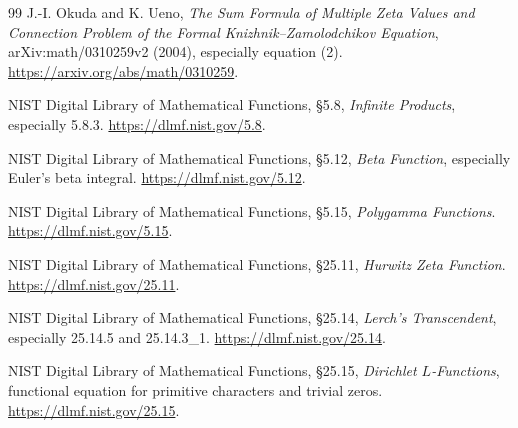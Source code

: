 \begin{thebibliography}{99}
J.-I. Okuda and K. Ueno,
\emph{The Sum Formula of Multiple Zeta Values and Connection Problem
of the Formal Knizhnik--Zamolodchikov Equation},
arXiv:math/0310259v2 (2004), especially equation (2).
\url{https://arxiv.org/abs/math/0310259}.

NIST Digital Library of Mathematical Functions,
\S5.8, \emph{Infinite Products}, especially 5.8.3.
\url{https://dlmf.nist.gov/5.8}.

NIST Digital Library of Mathematical Functions,
\S5.12, \emph{Beta Function}, especially Euler's beta integral.
\url{https://dlmf.nist.gov/5.12}.

NIST Digital Library of Mathematical Functions,
\S5.15, \emph{Polygamma Functions}.
\url{https://dlmf.nist.gov/5.15}.

NIST Digital Library of Mathematical Functions,
\S25.11, \emph{Hurwitz Zeta Function}.
\url{https://dlmf.nist.gov/25.11}.

NIST Digital Library of Mathematical Functions,
\S25.14, \emph{Lerch's Transcendent},
especially 25.14.5 and 25.14.3\_1.
\url{https://dlmf.nist.gov/25.14}.

NIST Digital Library of Mathematical Functions,
\S25.15, \emph{Dirichlet $L$-Functions}, functional equation
for primitive characters and trivial zeros.
\url{https://dlmf.nist.gov/25.15}.

\end{thebibliography}
